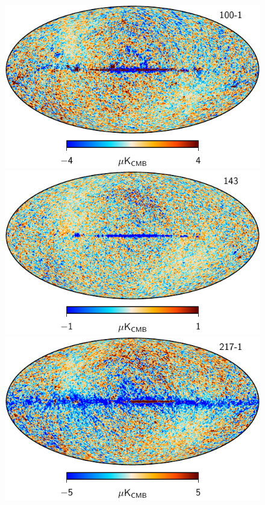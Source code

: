 \documentclass{aa}
\begin{document}
\begin{figure}
  \centering
  \includegraphics[width=\columnwidth]{figures/res_100-1_1deg_v1.pdf}\\
  \includegraphics[width=\columnwidth]{figures/res_143_1deg_v1.pdf}\\
  \includegraphics[width=\columnwidth]{figures/res_217-1_1deg_v1.pdf}\\

\end{figure}
\end{document}
